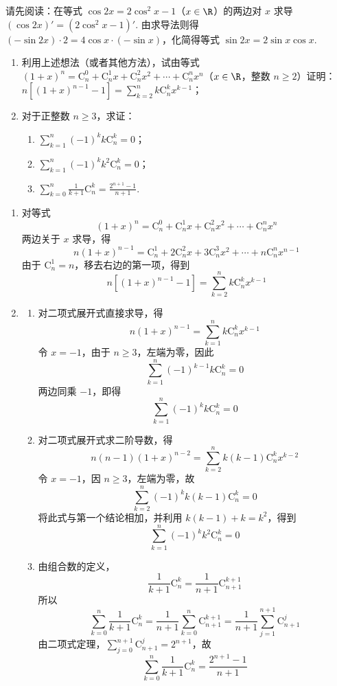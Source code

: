 \begin{problem}
请先阅读：在等式 \(\cos 2x = 2\cos^2 x - 1\)（\(x \in \R\)）的两边对 \(x\) 求导 \((\cos 2x)' = (2\cos^2 x - 1)'\). 由求导法则得 \((- \sin 2x)\cdot 2 = 4\cos x \cdot (-\sin x)\)，化简得等式 \(\sin 2x = 2\sin x\cos x\).

\begin{enumerate}
\item 利用上述想法（或者其他方法），试由等式 \((1 + x)^n = \mathrm C_n^0 + \mathrm C_n^1x + \mathrm C_n^2x^2 + \cdots + \mathrm C_n^n x^n\)（\(x \in \R\)，整数 \(n \geqslant 2\)）证明：\(n\left[(1 + x)^{n-1} - 1\right] = \sum_{k=2}^{n} k \mathrm C_n^k x^{k-1}\)；
\item 对于正整数 \(n \geqslant 3\)，求证：
\begin{enumerate}
\item \(\sum_{k=1}^{n} (-1)^k k \mathrm C_n^k = 0\)；
\item \(\sum_{k=1}^{n} (-1)^k k^2 \mathrm C_n^k = 0\)；
\item \(\sum_{k=0}^{n} \frac{1}{k+1} \mathrm C_n^k = \frac{2^{n+1} - 1}{n+1}\).
\end{enumerate}
\end{enumerate}
\end{problem}

\begin{solution}
\begin{enumerate}
\item 对等式
\[
(1+x)^n=\mathrm C_n^0+\mathrm C_n^1x+\mathrm C_n^2x^2+\cdots+\mathrm C_n^n x^n
\]
两边关于 \(x\) 求导，得
\[
n(1+x)^{n-1}=\mathrm C_n^1+2\mathrm C_n^2x+3\mathrm C_n^3x^2+\cdots+n\mathrm C_n^n x^{n-1}
\]
由于 \(\mathrm C_n^1=n\)，移去右边的第一项，得到
\[
n\left[(1+x)^{n-1}-1\right]=\sum_{k=2}^{n}k\mathrm C_n^k x^{k-1}
\]

\item
\begin{enumerate}
\item 对二项式展开式直接求导，得
\[
n(1+x)^{n-1}=\sum_{k=1}^{n}k\mathrm C_n^k x^{k-1}
\]
令 \(x=-1\)，由于 \(n\geqslant3\)，左端为零，因此
\[
\sum_{k=1}^{n}(-1)^{k-1}k\mathrm C_n^k=0
\]
两边同乘 \(-1\)，即得
\[
\sum_{k=1}^{n}(-1)^k k\mathrm C_n^k=0
\]

\item 对二项式展开式求二阶导数，得
\[
n(n-1)(1+x)^{n-2}=\sum_{k=2}^{n}k(k-1)\mathrm C_n^k x^{k-2}
\]
令 \(x=-1\)，因 \(n\geqslant3\)，左端为零，故
\[
\sum_{k=2}^{n}(-1)^k k(k-1)\mathrm C_n^k=0
\]
将此式与第一个结论相加，并利用 \(k(k-1)+k=k^2\)，得到
\[
\sum_{k=1}^{n}(-1)^k k^2\mathrm C_n^k=0
\]

\item 由组合数的定义，
\[
\frac{1}{k+1}\mathrm C_n^k=\frac{1}{n+1}\mathrm C_{n+1}^{k+1}
\]
所以
\[
\sum_{k=0}^{n}\frac{1}{k+1}\mathrm C_n^k=\frac{1}{n+1}\sum_{k=0}^{n}\mathrm C_{n+1}^{k+1}=\frac{1}{n+1}\sum_{j=1}^{n+1}\mathrm C_{n+1}^{j}
\]
由二项式定理，\(\sum_{j=0}^{n+1}\mathrm C_{n+1}^{j}=2^{n+1}\)，故
\[
\sum_{k=0}^{n}\frac{1}{k+1}\mathrm C_n^k=\frac{2^{n+1}-1}{n+1}
\]
\end{enumerate}
\end{enumerate}
\end{solution}
